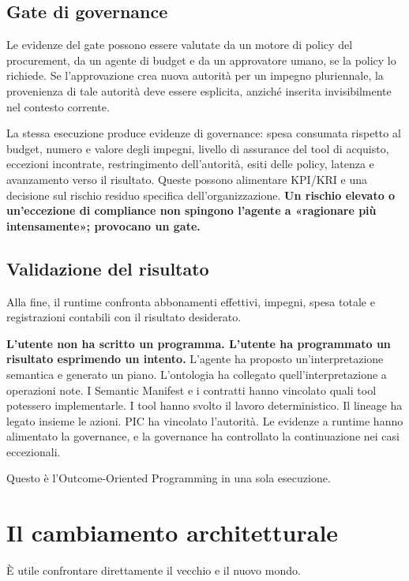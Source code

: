 \documentclass[10pt,oneside,openany]{book}
\begin{document}
\section{Gate di governance}
Le evidenze del gate possono essere valutate da un motore di policy del procurement, da un agente di budget e da un approvatore umano, se la policy lo richiede. Se l'approvazione crea nuova autorità per un impegno pluriennale, la provenienza di tale autorità deve essere esplicita, anziché inserita invisibilmente nel contesto corrente.

La stessa esecuzione produce evidenze di governance: spesa consumata rispetto al budget, numero e valore degli impegni, livello di assurance del tool di acquisto, eccezioni incontrate, restringimento dell'autorità, esiti delle policy, latenza e avanzamento verso il risultato. Queste possono alimentare KPI/KRI e una decisione sul rischio residuo specifica dell'organizzazione. \textbf{Un rischio elevato o un'eccezione di compliance non spingono l'agente a «ragionare più intensamente»; provocano un gate.}

\section{Validazione del risultato}
Alla fine, il runtime confronta abbonamenti effettivi, impegni, spesa totale e registrazioni contabili con il risultato desiderato.

\textbf{L'utente non ha scritto un programma. L'utente ha programmato un risultato esprimendo un intento.} L'agente ha proposto un'interpretazione semantica e generato un piano. L'ontologia ha collegato quell'interpretazione a operazioni note. I Semantic Manifest e i contratti hanno vincolato quali tool potessero implementarle. I tool hanno svolto il lavoro deterministico. Il lineage ha legato insieme le azioni. PIC ha vincolato l'autorità. Le evidenze a runtime hanno alimentato la governance, e la governance ha controllato la continuazione nei casi eccezionali.

Questo è l'Outcome-Oriented Programming in una sola esecuzione.

\chapter{Il cambiamento architetturale}

È utile confrontare direttamente il vecchio e il nuovo mondo.
\end{document}
